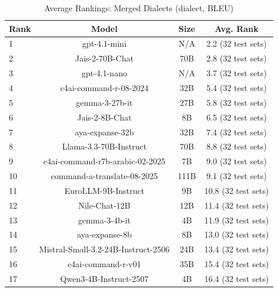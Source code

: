 \begin{table}[htbp]
\centering
\caption{Average Rankings: Merged Dialects (dialect, BLEU)}
\label{tab:avg_rankings_bleu_dialect}
\begin{tabular}{l@{\hspace{3pt}}c@{\hspace{3pt}}c@{\hspace{3pt}}c}
\toprule
Rank & Model & Size & Avg. Rank \\
\midrule
1 & gpt-4.1-mini & N/A & 2.2 (32 test sets) \\
2 & Jais-2-70B-Chat & 70B & 2.8 (32 test sets) \\
3 & gpt-4.1-nano & N/A & 3.7 (32 test sets) \\
4 & c4ai-command-r-08-2024 & 32B & 5.4 (32 test sets) \\
5 & gemma-3-27b-it & 27B & 5.8 (32 test sets) \\
6 & Jais-2-8B-Chat & 8B & 6.5 (32 test sets) \\
7 & aya-expanse-32b & 32B & 7.4 (32 test sets) \\
8 & Llama-3.3-70B-Instruct & 70B & 8.8 (32 test sets) \\
9 & c4ai-command-r7b-arabic-02-2025 & 7B & 9.0 (32 test sets) \\
10 & command-a-translate-08-2025 & 111B & 9.1 (32 test sets) \\
11 & EuroLLM-9B-Instruct & 9B & 10.8 (32 test sets) \\
12 & Nile-Chat-12B & 12B & 11.4 (32 test sets) \\
13 & gemma-3-4b-it & 4B & 11.9 (32 test sets) \\
14 & aya-expanse-8b & 8B & 13.0 (32 test sets) \\
15 & Mistral-Small-3.2-24B-Instruct-2506 & 24B & 13.4 (32 test sets) \\
16 & c4ai-command-r-v01 & 35B & 15.4 (32 test sets) \\
17 & Qwen3-4B-Instruct-2507 & 4B & 16.4 (32 test sets) \\
\bottomrule
\end{tabular}
\end{table}